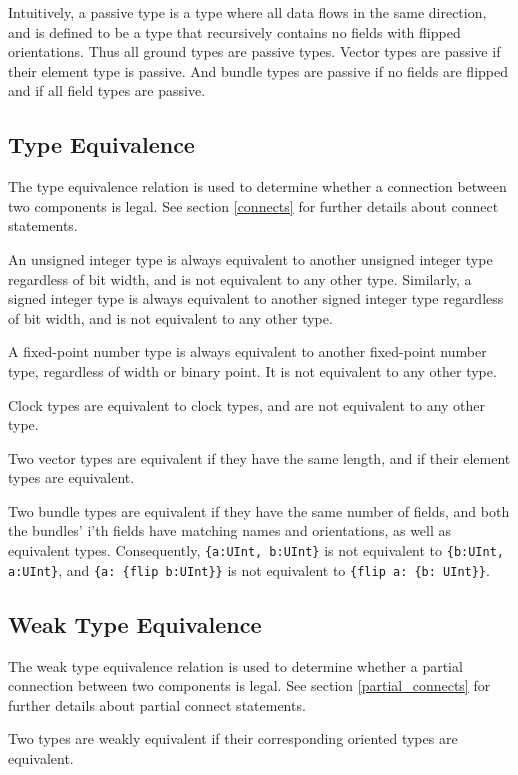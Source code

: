 \documentclass[12pt]{article}
\begin{document}
Intuitively, a passive type is a type where all data flows in the same direction, and is defined to be a type that recursively contains no fields with flipped orientations. Thus all ground types are passive types. Vector types are passive if their element type is passive. And bundle types are passive if no fields are flipped and if all field types are passive.

\subsection{Type Equivalence} \label{type_equivalence}

The type equivalence relation is used to determine whether a connection between two components is legal. See section \ref{connects} for further details about connect statements.

An unsigned integer type is always equivalent to another unsigned integer type regardless of bit width, and is not equivalent to any other type. Similarly, a signed integer type is always equivalent to another signed integer type regardless of bit width, and is not equivalent to any other type.

A fixed-point number type is always equivalent to another fixed-point number type, regardless of width or binary point. It is not equivalent to any other type.

Clock types are equivalent to clock types, and are not equivalent to any other type.

Two vector types are equivalent if they have the same length, and if their element types are equivalent.

Two bundle types are equivalent if they have the same number of fields, and both the bundles' i'th fields have matching names and orientations, as well as equivalent types. Consequently, \verb|{a:UInt, b:UInt}| is not equivalent to \verb|{b:UInt, a:UInt}|, and \verb|{a: {flip b:UInt}}| is not equivalent to \verb|{flip a: {b: UInt}}|.

\subsection{Weak Type Equivalence} \label{weak_type_equivalence}

The weak type equivalence relation is used to determine whether a partial connection between two components is legal. See section \ref{partial_connects} for further details about partial connect statements.

Two types are weakly equivalent if their corresponding oriented types are equivalent.
\end{document}
